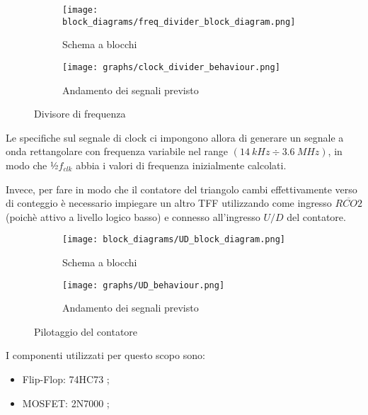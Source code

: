 \begin{figure}[H]
    \centering

    \begin{subfigure}{.5\textwidth}
        \centering
        \texttt{[image: block\_diagrams/freq\_divider\_block\_diagram.png]}
        \caption{Schema a blocchi}
        \label{freq_divider_block_diagram}
    \end{subfigure}%
    \begin{subfigure}{.5\textwidth}
        \centering
        \texttt{[image: graphs/clock\_divider\_behaviour.png]}
        \caption{Andamento dei segnali previsto}
        \label{clock_divider_behaviour}
    \end{subfigure}

    \caption{Divisore di frequenza}
\end{figure}

Le specifiche sul segnale di clock ci impongono allora di generare un segnale a onda rettangolare
con frequenza variabile nel range $(14\ kHz\div3.6\ MHz)$, in modo che ½$f_{clk}$ abbia
i valori di frequenza inizialmente calcolati.

Invece, per fare in modo che il contatore del triangolo cambi effettivamente verso di conteggio
è necessario impiegare un altro TFF utilizzando come ingresso $\overline{RCO2}$ (poichè
attivo a livello logico basso) e connesso all'ingresso $U/D$ del contatore.

\begin{figure}[H]
    \centering

    \begin{subfigure}{.5\textwidth}
        \centering
        \texttt{[image: block\_diagrams/UD\_block\_diagram.png]}
        \caption{Schema a blocchi}
        \label{UD_block_diagram}
    \end{subfigure}%
    \begin{subfigure}{.5\textwidth}
        \centering
        \texttt{[image: graphs/UD\_behaviour.png]}
        \caption{Andamento dei segnali previsto}
        \label{UD_behaviour}
    \end{subfigure}

    \caption{Pilotaggio del contatore}
\end{figure}

I componenti utilizzati per questo scopo sono:

\begin{itemize}
    \item Flip-Flop: 74HC73 \cite{74hc73};
    \item MOSFET: 2N7000 \cite{2n7000};
\end{itemize}


